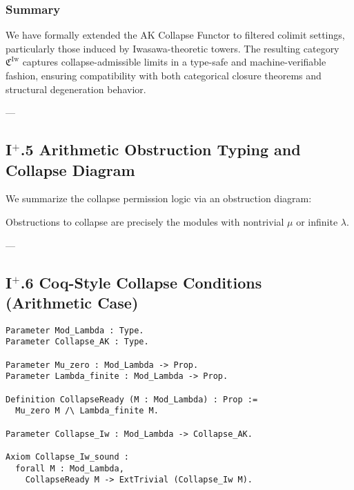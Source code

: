 \documentclass[11pt]{article}
\begin{document}
\subsubsection*{Summary}

We have formally extended the AK Collapse Functor to filtered colimit settings, particularly those induced by Iwasawa-theoretic towers. The resulting category $\mathfrak{C}^{\mathrm{Iw}}$ captures collapse-admissible limits in a type-safe and machine-verifiable fashion, ensuring compatibility with both categorical closure theorems and structural degeneration behavior.

---

\subsection*{I$^{+}$.5 Arithmetic Obstruction Typing and Collapse Diagram}

We summarize the collapse permission logic via an obstruction diagram:

\begin{center}
\end{center}

Obstructions to collapse are precisely the modules with nontrivial $\mu$ or infinite $\lambda$.

---

\subsection*{I$^{+}$.6 Coq-Style Collapse Conditions (Arithmetic Case)}

\begin{lstlisting}[language=Coq]
Parameter Mod_Lambda : Type.
Parameter Collapse_AK : Type.

Parameter Mu_zero : Mod_Lambda -> Prop.
Parameter Lambda_finite : Mod_Lambda -> Prop.

Definition CollapseReady (M : Mod_Lambda) : Prop :=
  Mu_zero M /\ Lambda_finite M.

Parameter Collapse_Iw : Mod_Lambda -> Collapse_AK.

Axiom Collapse_Iw_sound :
  forall M : Mod_Lambda,
    CollapseReady M -> ExtTrivial (Collapse_Iw M).
\end{lstlisting}
\end{document}
